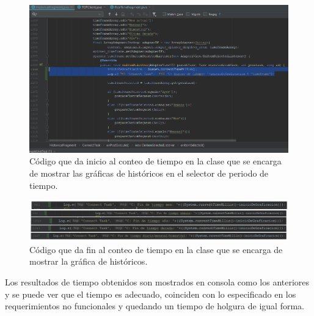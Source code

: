 \begin{figure}[H]
	\centering
	\includegraphics[scale=.6]{Capitulo5/images/TiempoCompletoCodigoInicioH2.png}
	\caption{Código que da inicio al conteo de tiempo en la clase que se encarga de mostrar las gráficas de históricos en el selector de periodo de tiempo.}	\label{fig:TiempoCompletoHInicio2}
\end{figure} 

\begin{figure}[H]
	\centering
	\includegraphics[scale=.5]{Capitulo5/images/TiempoCompletoCodigoFinH.png}
	\caption{Código que da fin al conteo de tiempo en la clase que se encarga de mostrar la gráfica de históricos.}	\label{fig:TiempoCompletoHFin}
\end{figure} 

Los resultados de tiempo obtenidos son mostrados en consola como los anteriores y se puede ver que el tiempo es adecuado, coinciden con lo especificado en los requerimientos no funcionales y quedando un tiempo de holgura de igual forma.\\ \newline

